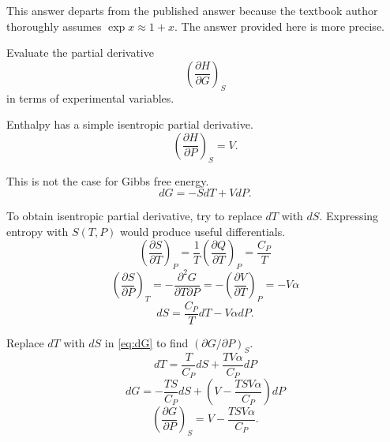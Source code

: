 \begin{@empty}
\begin{answer}
\begin{enumerate}
            This answer departs from the published answer because the textbook
            author thoroughly assumes $\exp x \approx 1 + x$.  The answer
            provided here is more precise.
    \end{enumerate}
\end{answer}

\begin{problem}
\end{problem}

\begin{problem}
\end{problem}

\begin{problem}
\end{problem}

\begin{problem}
\end{problem}

\begin{problem}
    Evaluate the partial derivative
    \[ \left( \frac{\partial H}{\partial G} \right)_S \]
    in terms of experimental variables.
\end{problem}

\begin{answer}
    Enthalpy has a simple isentropic partial derivative.
    \begin{equation}
       \left( \frac{\partial H}{\partial P} \right)_S = V. \label{eq:HPS}
    \end{equation}

    This is not the case for Gibbs free energy.
    \begin{equation}
        dG = -SdT + VdP. \label{eq:dG}
    \end{equation}

    To obtain isentropic partial derivative, try to replace $dT$ with $dS$.
    Expressing entropy with $S(T, P)$ would produce useful differentials.
    \[
        \left( \frac{\partial S}{\partial T} \right)_P
        = \frac1T \left( \frac{\partial Q}{\partial T} \right)_P
        = \frac{C_P}{T}
    \]
    \[
        \left( \frac{\partial S}{\partial P} \right)_T
        = -\frac{\partial^2 G}{\partial T \partial P}
        = -\left( \frac{\partial V}{\partial T} \right)_P
        = -V \alpha
    \]
    \[ dS = \frac{C_P}{T} dT - V \alpha dP. \]

    Replace $dT$ with $dS$ in \eqref{eq:dG} to find
    $\left( \partial G / \partial P \right)_S$.
    \[ dT = \frac{T}{C_P} dS + \frac{TV\alpha}{C_P} dP \]
    \[ dG = -\frac{TS}{C_P} dS + \left( V - \frac{TSV\alpha}{C_P} \right) dP \]
    \begin{equation}
        \left( \frac{\partial G}{\partial P} \right)_S = V - \frac{TSV\alpha}{C_P}. \label{eq:GPS}
    \end{equation}


\end{answer}
\end{@empty}
